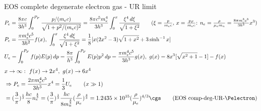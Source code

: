 \begin{frame}{EOS complete degenerate electron gas - UR limit}
\begin{align*}
    &P_e=\frac{8\pi c}{3h^3}\int_0^{P_F}\frac{p/(m_ec)}{\sqrt{1+p^2/(m_ec)^2}}=\frac{8\pi c^5 m_e^4}{3h^3}\int_0^x \frac{\xi^4\,d\xi}{\sqrt{1+\xi^2}}\tag{$\xi=\frac{p}{m_ec}$, $x=\frac{p_F}{m_ec}$: $n_e=\frac{\rho}{\mu_em_u}=\frac{8\pi m_e^3c^3}{3h^3}x^3$}\\
    &P_e=\frac{\pi m_e^4c^5}{3h^2}f(x),\ \int_0^x \frac{\xi^4\,d\xi}{\sqrt{1+\xi^2}}=\frac{1}{8}[x(2x^2-3)\sqrt{1+x^2}+3\sinh^{-1}{x}]\\
    &U_e=\int_0^{P_F}f(p)E(p)\,dp=\frac{8\pi}{h^3}\int_0^{P_F}E(p)p^2\,dp=\frac{\pi m_e^4c^5}{3h^3}g(x),\ g(x)=8x^3[\sqrt{x^2+1}-1]-f(x)\\
\end{align*}
\begin{align*}
    &x\to\infty:\ f(x)\to 2x^4,\ g(x)\to6x^4\\
    &\Rightarrow P_e=\frac{2\pi m_e^4c^5}{3h^3}x^4=\frac{1}{3}U_e\tag{$x\gg1$}\\
    &=(\frac{3}{\pi})^{\frac{1}{3}}\frac{hc}{8}n_e^{\frac{4}{3}}=(\frac{3}{\pi})^{\frac{1}{3}}\frac{hc}{8m_u^{\frac{4}{3}}}(\frac{\rho}{\mu_e})^{\frac{4}{3}}=\num{1.2435e15}(\frac{\rho}{\mu_e})\expy{4/3}\si{\cgs}\tag{EOS comp-deg-UR-\Pelectron}
\end{align*}
\end{frame}

